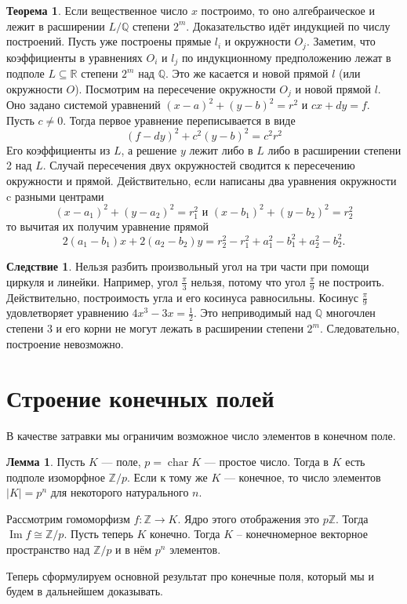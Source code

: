 \documentclass[12pt,a4paper,oneside]{book}
\theoremstyle{definition}
\newtheorem{thm}{\color{red!40!black}Теорема}
\newtheorem{lem}{\color{green!50!black}Лемма}
\newtheorem{cor}{\color{green!45!black}Следствие}
\newcommand{\chr}{\operatorname{char}}
\newcommand{\im}{\operatorname{Im}}
\newcommand{\Z}{\mathbb Z}
\newcommand{\R}{\mathbb R}
\newcommand{\Q}{\mathbb Q}
\def\thrm{\begin{thm}}
\def\ethrm{\end{thm}}
\def\lm{\begin{lem}}
\def\elm{\end{lem}}
\def\crl{\begin{cor}}
\def\ecrl{\end{cor}}
\begin{document}
\thrm Если вещественное число $x$ построимо, то оно алгебраическое и лежит в расширении $L/\Q$ степени $2^m$.
\proof Доказательство идёт индукцией по числу построений. Пусть уже построены прямые $l_i$ и окружности $O_j$. Заметим, что коэффициенты в уравнениях $O_i$ и $l_j$ по индукционному предположению лежат в подполе $L\subseteq \R$ степени $2^m$ над $\Q$. Это же касается и новой прямой $l$ (или окружности $O$). Посмотрим на пересечение окружности $O_j$ и новой прямой $l$. Оно задано системой уравнений $(x-a)^2+(y-b)^2=r^2$ и $cx+dy=f$. Пусть $c\neq 0$. Тогда первое уравнение переписывается в виде $$(f-dy)^2+c^2(y-b)^2=c^2r^2$$
Его коэффициенты из $L$, а решение $y$ лежит либо в $L$ либо в расширении степени 2 над $L$. Случай пересечения двух окружностей сводится к пересечению окружности и прямой.  Действительно, если написаны два уравнения окружности c разными центрами
$$(x-a_1)^2+(y-a_2)^2=r^2_1 \text{ и } (x-b_1)^2+(y-b_2)^2=r^2_2$$
то вычитая их получим уравнение прямой
$$2(a_1-b_1)x+2(a_2-b_2)y=r^2_2-r^2_1+a_1^2-b_1^2+a_2^2-b_2^2.$$

\endproof
\ethrm

\crl
Нельзя разбить произвольный угол на три части при помощи циркуля и линейки.
\proof Например, угол $\frac{\pi}{3}$ нельзя, потому что угол $\frac\pi 9$ не построить. Действительно, построимость угла и его косинуса равносильны. Косинус $\frac{\pi}{9}$ удовлетворяет уравнению $4x^3-3x=\frac{1}{2}$. Это неприводимый над $\Q$ многочлен степени 3 и его корни не могут лежать в расширении степени $2^m$. Следовательно, построение невозможно. 
\endproof
\ecrl

\section{Строение конечных полей}

В качестве затравки мы ограничим возможное число элементов в конечном поле.

\lm Пусть $K$ --- поле, $p=\chr K$ --- простое число. Тогда в $K$ есть подполе изоморфное $\Z/p$. Если к тому же $K$ --- конечное, то число элементов $|K|=p^n$ для некоторого натурального $n$. 
\elm


\proof Рассмотрим гомоморфизм $f\colon \Z \to K$. Ядро этого отображения это $p\Z$. Тогда $\im f\cong \Z/p$. Пусть теперь $K$ конечно. Тогда $K$ -- конечномерное векторное пространство над $\Z/p$ и в нём $p^n$ элементов.
\endproof
 
Теперь сформулируем основной результат про конечные поля, который мы и будем в дальнейшем доказывать.
\end{document}
